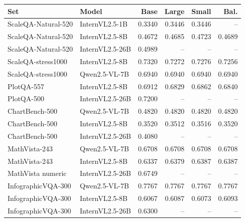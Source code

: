 \begin{tabular}{llrrrr}
\toprule
Set & Model & Base & Large & Small & Bal. \\
\midrule
ScaleQA-Natural-520 & InternVL2.5-1B & 0.3340 & 0.3446 & 0.3446 & -- \\
ScaleQA-Natural-520 & InternVL2.5-8B & 0.4672 & 0.4685 & 0.4723 & 0.4689 \\
ScaleQA-Natural-520 & InternVL2.5-26B & 0.4989 & -- & -- & -- \\
ScaleQA-stress1000 & InternVL2.5-8B & 0.7320 & 0.7272 & 0.7276 & 0.7256 \\
ScaleQA-stress1000 & Qwen2.5-VL-7B & 0.6940 & 0.6940 & 0.6940 & 0.6940 \\
PlotQA-557 & InternVL2.5-8B & 0.6912 & 0.6829 & 0.6862 & 0.6840 \\
PlotQA-500 & InternVL2.5-26B & 0.7200 & -- & -- & -- \\
ChartBench-500 & Qwen2.5-VL-7B & 0.4820 & 0.4820 & 0.4820 & 0.4820 \\
ChartBench-500 & InternVL2.5-8B & 0.3520 & 0.3512 & 0.3516 & 0.3520 \\
ChartBench-500 & InternVL2.5-26B & 0.4080 & -- & -- & -- \\
MathVista-243 & Qwen2.5-VL-7B & 0.6708 & 0.6708 & 0.6708 & 0.6708 \\
MathVista-243 & InternVL2.5-8B & 0.6337 & 0.6379 & 0.6387 & 0.6387 \\
MathVista numeric & InternVL2.5-26B & 0.6749 & -- & -- & -- \\
InfographicVQA-300 & Qwen2.5-VL-7B & 0.7767 & 0.7767 & 0.7767 & 0.7767 \\
InfographicVQA-300 & InternVL2.5-8B & 0.6067 & 0.6087 & 0.6073 & 0.6093 \\
InfographicVQA-300 & InternVL2.5-26B & 0.6300 & -- & -- & -- \\
\bottomrule
\end{tabular}

